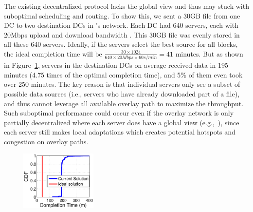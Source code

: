 The existing decentralized protocol lacks the global view and thus may stuck with suboptimal scheduling and routing.
To show this, we sent a 30GB file from one DC to two destination
DCs in \company's network.
Each DC had 640 servers, each with 20Mbps upload and download
bandwidth . This 30GB file was evenly stored in all these
640 servers.
Ideally, if the servers select
the best source for all blocks, the ideal
completion time will be
$\frac{30\times 1024}{640\times 20Mbps \times 60s/min} = 41$
minutes. But as shown in Figure~\ref{fig:motivation},
servers in the destination DCs on average received data in
195 minutes (4.75 times of the optimal completion
time), and 5\% of them even took over 250 minutes.
The key reason is that
individual servers only see a subset of possible data sources
(i.e., servers who have already downloaded part of a file),
and thus cannot leverage all available overlay path to
maximize the throughput.
Such suboptimal performance
could occur even if the overlay
network is only partially decentralized where each server does have a
global view (e.g.,~\cite{Huang2014A}),
since each server still makes local adaptations which creates potential
hotspots and congestion on overlay paths.


\begin{figure}[t]
  \centering
  \includegraphics[width=1.5in]{images/SEvsIdeal.eps}
  \vspace{-0.2cm}
  \label{fig:motivation}
\vspace{-0.4cm}
\end{figure}

